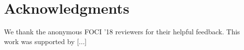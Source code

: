 
\section*{Acknowledgments}
We thank the anonymous FOCI '18 reviewers for their helpful
feedback. This work was supported by [...]